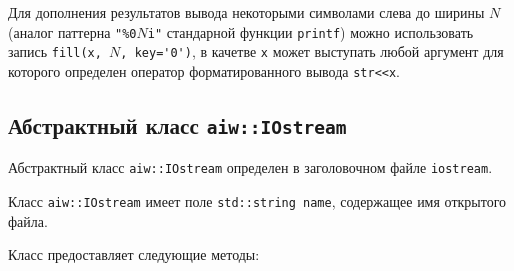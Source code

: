 Для дополнения результатов вывода некоторыми символами слева до 
ширины $N$ (аналог паттерна \verb'"%0'$N$\verb'i"' стандарной функции
\verb'printf') можно использовать запись
\verb|fill(x, |$N$\verb|, key='0')|, в качетве \verb'x' может
выступать любой аргумент для которого определен оператор
форматированного вывода \verb'str<<x'. 


\subsection{Абстрактный класс {\tt aiw::IOstream}}
Абстрактный класс \verb'aiw::IOstream' определен в заголовочном файле \verb'iostream'.

Класс \verb'aiw::IOstream' имеет поле \verb'std::string name', содержащее имя открытого файла.

Класс предоставляет следующие методы:
